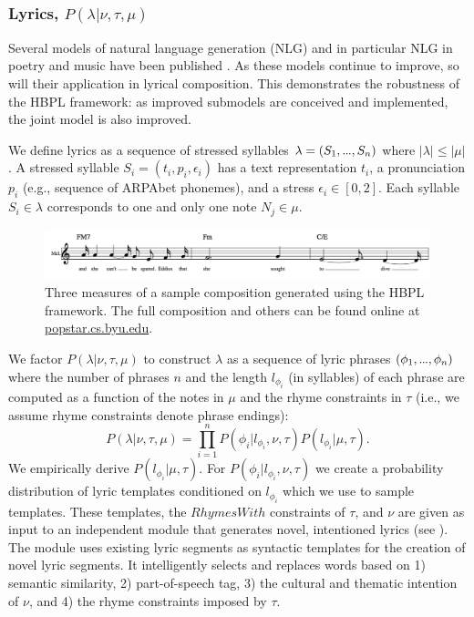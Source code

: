 \documentclass[phd,electronic,oneside,twosidetoc,letterpaper,chaptercenter,parttop,lol,lof,lot]{byumsphd}
\newcommand\mydots{\hbox to .75em{.\hss.\hss.}}
\begin{document}
\subsubsection{Lyrics, $P(\lambda|\nu,\tau,\mu)$}

Several models of natural language generation (NLG) and in particular NLG in poetry and music have been published \cite{paris2013natural}. As these models continue to improve, so will their application in lyrical composition. This demonstrates the robustness of the HBPL framework: as improved submodels are conceived and implemented, the joint model is also improved.

We define lyrics as a sequence of stressed syllables $\lambda=(S_1,\mydots,S_n)$ where $|\lambda| \le |\mu|$. A stressed syllable $S_i = (t_i, p_i, \epsilon_i)$ has a text representation $t_i$, a pronunciation $p_i$ (e.g., sequence of ARPAbet phonemes), and a stress $\epsilon_i\in[0,2]$. Each syllable $S_i\in\lambda$ corresponds to one and only one note $N_j\in\mu$.
\begin{figure}
	\centering
	\includegraphics[width=\linewidth]{example}
	\caption{\label{fig:example_composition} Three measures of a sample composition generated using the HBPL framework. The full composition and others can be found online at \url{popstar.cs.byu.edu}.}
\end{figure}

We factor $P(\lambda|\nu,\tau,\mu)$ to construct $\lambda$ as a sequence of lyric phrases $(\phi_1,\mydots,\phi_n)$ where the number of phrases $n$ and the length $l_{\phi_i}$ (in syllables) of each phrase are computed as a function of the notes in $\mu$ and the rhyme constraints in $\tau$ (i.e., we assume rhyme constraints denote phrase endings):
\[ P(\lambda|\nu,\tau,\mu) = \prod_{i=1}^n P(\phi_i | l_{\phi_i},\nu,\tau) P(l_{\phi_i} | \mu,\tau). \]
We empirically derive $P(l_{\phi_i} | \mu,\tau)$. For $P(\phi_i | l_{\phi_i},\nu,\tau)$ we create a probability distribution of lyric templates conditioned on $l_{\phi_i}$ which we use to sample templates. These templates, the $RhymesWith$ constraints of $\tau$, and $\nu$ are given as input to an independent module that generates novel, intentioned lyrics (see \citeauthor{bay2017ICCC} \cite{bay2017ICCC}). The module uses existing lyric segments as syntactic templates for the creation of novel lyric segments. It intelligently selects and replaces words based on 1) semantic similarity, 2) part-of-speech tag, 3) the cultural and thematic intention of $\nu$, and 4) the rhyme constraints imposed by $\tau$.
\end{document}
